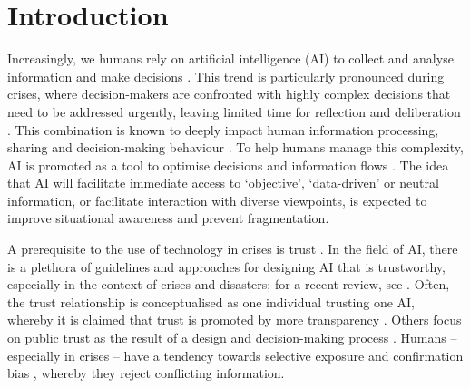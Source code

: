 \documentclass[sn-apacite]{sn-jnl}
\begin{document}

\maketitle

\section{Introduction}\label{sec:intro}

Increasingly, we humans rely on artificial intelligence (AI) to collect and analyse information and make decisions \citep{klingbeil2024trust}. %
This trend is particularly pronounced during crises, where decision-makers are confronted with highly complex decisions that need to be addressed urgently, leaving limited time for reflection and deliberation \citep{mendonca2001decision}. %
This combination is known to deeply impact human information processing, sharing and decision-making behaviour \citep{comes2020coordination}. %
To help humans manage this complexity, AI is promoted as a tool to optimise decisions and information flows \citep{jeon2024hearhere}. %
The idea that AI will facilitate immediate access to `objective', `data-driven' or neutral information, or facilitate interaction with diverse viewpoints, is expected to improve situational awareness and prevent fragmentation.

A prerequisite to the use of technology in crises is trust \citep{steinbrink2024transparency}. %
In the field of AI, there is a plethora of guidelines and approaches for designing AI that is trustworthy, especially in the context of crises and disasters; for a recent review, see \citet{albahri2024systematic}. %
Often, the trust relationship is conceptualised as one individual trusting one AI, whereby it is claimed that trust is promoted by more transparency \citep{visave2025transparency}. %
Others focus on public trust as the result of a design and decision-making process \citep{tzachor2020artificial}. %
Humans -- especially in crises -- have a tendency towards selective exposure \citep{barbera2015tweeting} and confirmation bias \citep{paulus2024interplay}, whereby they reject conflicting information. %
\end{document}
